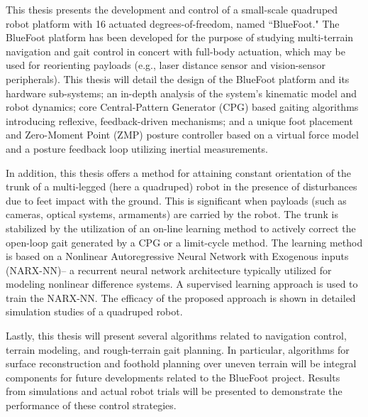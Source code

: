 {}
{
	This thesis presents the development and control of a small-scale quadruped robot platform with 16 actuated degrees-of-freedom, named ``BlueFoot." The BlueFoot platform has been developed for the purpose of studying multi-terrain navigation and gait control in concert with full-body actuation, which may be used for reorienting payloads (e.g., laser distance sensor and vision-sensor peripherals). This thesis will detail the design of the BlueFoot platform and its hardware sub-systems; an in-depth analysis of the system's kinematic model and robot dynamics; core Central-Pattern Generator (CPG) based gaiting algorithms introducing reflexive, feedback-driven mechanisms; and a unique foot placement and Zero-Moment Point (ZMP) posture controller based on a virtual force model and a posture feedback loop utilizing inertial measurements. %

	In addition, this thesis offers a method for attaining constant orientation of the trunk of a multi-legged (here a quadruped) robot in the presence of disturbances due to feet impact with the ground. This is significant when payloads (such as cameras, optical systems, armaments) are carried by the robot.  The trunk is stabilized by the utilization of an on-line learning method to actively correct the open-loop gait generated by a CPG or a limit-cycle method. The learning method is based on a Nonlinear Autoregressive Neural Network with Exogenous inputs (NARX-NN)-- a recurrent neural network architecture typically utilized for modeling nonlinear difference systems. A supervised learning approach is used to train the NARX-NN. 
	The efficacy of the proposed approach is shown in detailed simulation studies of a quadruped robot. 

	Lastly, this thesis will present several algorithms related to navigation control, terrain modeling, and rough-terrain gait planning. In particular, algorithms for surface reconstruction and foothold planning over uneven terrain will be integral components for future developments related to the BlueFoot project. Results from simulations and actual robot trials will be presented to demonstrate the performance of these control strategies. 
}
{\endmsabstract}